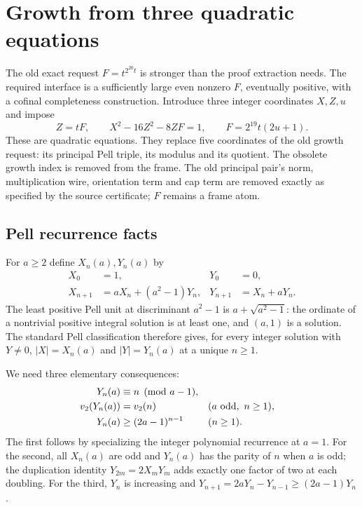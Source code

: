 \documentclass[11pt,a4paper]{article}
\theoremstyle{remark}\newtheorem{remark}[theorem]{Remark}
\newcommand{\vp}{v_2}
\begin{document}
\section{Growth from three quadratic equations}\label{sec:growth}

The old exact request $F=t^{2^{20}t}$ is stronger than the proof extraction
needs. The required interface is a sufficiently large even nonzero $F$,
eventually positive, with a cofinal completeness construction. Introduce
three integer coordinates $X,Z,u$ and impose
\begin{equation}\label{eq:growth}
\boxed{\quad Z=tF,\qquad X^2-16Z^2-8ZF=1,\qquad
F=2^{19}t(2u+1).\quad}
\end{equation}
These are quadratic equations. They replace five coordinates of the old
growth request: its principal Pell triple, its modulus and its quotient.
The obsolete growth index is removed from the frame. The old principal pair's
norm, multiplication wire, orientation term and cap term are removed exactly
as specified by the source certificate; $F$ remains a frame atom.

\subsection{Pell recurrence facts}

For $a\ge2$ define $X_n(a),Y_n(a)$ by
\begin{align*}
X_0&=1,&Y_0&=0,\\
X_{n+1}&=aX_n+(a^2-1)Y_n,&Y_{n+1}&=X_n+aY_n.
\end{align*}
The least positive Pell unit at discriminant $a^2-1$ is
$a+\sqrt{a^2-1}$: the ordinate of a nontrivial positive integral solution
is at least one, and $(a,1)$ is a solution. The standard Pell classification
therefore gives, for every integer solution with $Y\ne0$,
$|X|=X_n(a)$ and $|Y|=Y_n(a)$ at a unique $n\ge1$.

We need three elementary consequences:
\begin{align}
Y_n(a)&\equiv n\pmod{a-1},\label{eq:indexcong}\\
\vp(Y_n(a))&=\vp(n) &&(a\hbox{ odd},\ n\ge1),\label{eq:valuation}\\
Y_n(a)&\ge(2a-1)^{n-1} &&(n\ge1).\label{eq:pellgrowth}
\end{align}
The first follows by specializing the integer polynomial recurrence at
$a=1$. For the second, all $X_n(a)$ are odd and $Y_n(a)$ has the parity of
$n$ when $a$ is odd; the duplication identity
$Y_{2m}=2X_mY_m$ adds exactly one factor of two at each doubling. For the
third, $Y_n$ is increasing and
$Y_{n+1}=2aY_n-Y_{n-1}\ge(2a-1)Y_n$.
\end{document}
